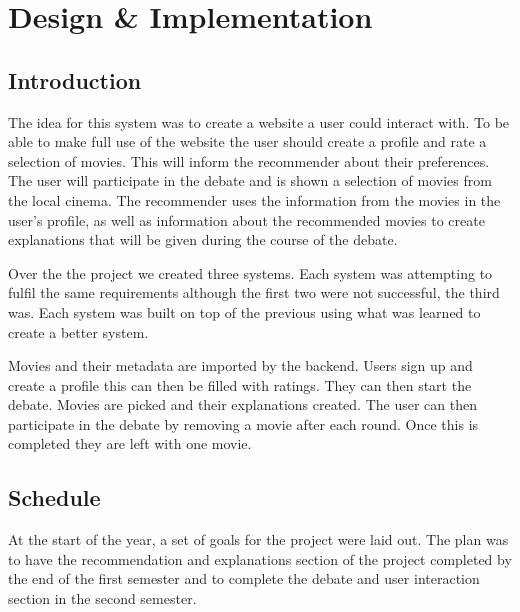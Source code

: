 \chapter{Design \& Implementation} %

        
        

    \section{Introduction}
            The idea for this system was to create a website a user could interact with. To be able to make full use of the website the user should create a profile and rate a selection of movies. This will inform the recommender about their preferences. The user will participate in the debate and is shown a selection of movies from the local cinema. The recommender uses the information from the movies in the user's profile, as well as information about the recommended movies to create explanations that will be given during the course of the debate.

            Over the the project we created three systems. Each system was attempting to fulfil the same requirements although the first two were not successful, the third was. Each system was built on top of the previous using what was learned to create a better system. 

            Movies and their metadata are imported by the backend. Users sign up and create a profile this can then be filled with ratings. They can then start the debate. Movies are picked and their explanations created. The user can then participate in the debate by removing a movie after each round. Once this is completed they are left with one movie.


    \section{Schedule}
        At the start of the year, a set of goals for the project were laid out. The plan was to have the recommendation and explanations section of the project completed by the end of the first semester and to complete the debate and user interaction section in the second semester.\\


